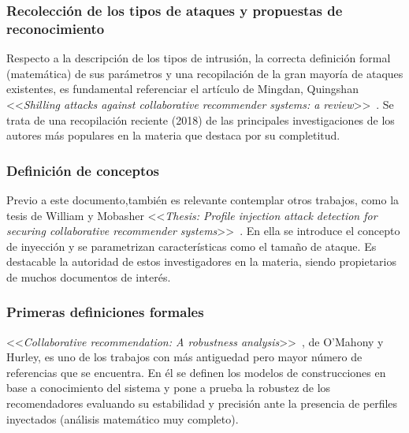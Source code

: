 \subsubsection{Recolección de los tipos de ataques y propuestas de reconocimiento~\cite{mingdan2018ShillingAttacksAReview}}
Respecto a la descripción de los tipos de intrusión, la correcta definición formal (matemática) de sus parámetros y una recopilación de la gran mayoría de ataques existentes, es fundamental referenciar el artículo de Mingdan, Quingshan <<\textit{Shilling attacks against collaborative recommender systems: a review}>>~\cite{mingdan2018ShillingAttacksAReview}. Se trata de una recopilación reciente (2018) de las principales investigaciones de los autores más populares en la materia que destaca por su completitud.

\subsubsection{Definición de conceptos~\cite{Mobasher2006Thesis}}
Previo a este documento,también es relevante contemplar otros trabajos, como la tesis de William y Mobasher <<\textit{Thesis: Profile injection attack detection for securing collaborative recommender systems}>>~\cite{Mobasher2006Thesis}. En ella se introduce el concepto de inyección y se parametrizan características como el tamaño de ataque. Es destacable la autoridad de estos investigadores en la materia, siendo propietarios de muchos documentos de interés.

	\subsubsection{Primeras definiciones formales~\citep{mahony2004CollaborativeRecommendation}}
<<\textit{Collaborative recommendation: A robustness analysis}>>~\cite{mahony2004CollaborativeRecommendation}, de O'Mahony y Hurley, es uno de los trabajos con más antiguedad pero mayor número de referencias que se encuentra. En él se definen los modelos de construcciones en base a conocimiento del sistema y pone a prueba la robustez de los recomendadores evaluando su estabilidad y precisión ante la presencia de perfiles inyectados (análisis matemático muy completo).